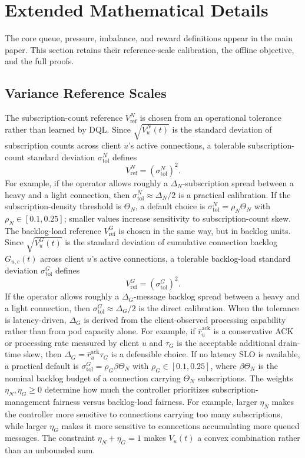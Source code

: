 \section{Extended Mathematical Details}
\label{app:extended-mathematics}
The core queue, pressure, imbalance, and reward definitions appear in the main
paper. This section retains their reference-scale calibration, the offline
objective, and the full proofs.
\subsection{Variance Reference Scales}
The subscription-count reference $V^N_{\mathrm{ref}}$ is chosen from an
operational tolerance rather than learned by DQL. Since
$\sqrt{V^N_u(t)}$ is the standard deviation of subscription counts across
client $u$'s active connections, a tolerable subscription-count standard
deviation $\sigma^{N}_{\mathrm{tol}}$ defines
\[
	V^N_{\mathrm{ref}}=(\sigma^{N}_{\mathrm{tol}})^2.
\]
For example, if the operator allows roughly a $\Delta_N$-subscription spread
between a heavy and a light connection, then
$\sigma^{N}_{\mathrm{tol}}\approx \Delta_N/2$ is a practical calibration. If
the subscription-density threshold is $\Theta_N$, a default choice is
$\sigma^{N}_{\mathrm{tol}}=\rho_N\Theta_N$ with
$\rho_N\in[0.1,0.25]$; smaller values increase sensitivity to
subscription-count skew.
The backlog-load reference $V^G_{\mathrm{ref}}$ is chosen in the same way,
but in backlog units. Since $\sqrt{V^G_u(t)}$ is the standard deviation of
cumulative connection backlog $G_{u,c}(t)$ across client $u$'s active
connections, a tolerable backlog-load standard deviation
$\sigma^{G}_{\mathrm{tol}}$ defines
\[
	V^G_{\mathrm{ref}}=(\sigma^{G}_{\mathrm{tol}})^2.
\]
If the operator allows roughly a $\Delta_G$-message backlog spread between a
heavy and a light connection, then
$\sigma^{G}_{\mathrm{tol}}\approx \Delta_G/2$ is the direct calibration. When
the tolerance is latency-driven, $\Delta_G$ is derived from the
client-observed processing capability rather than from pod capacity alone. For
example, if $\widehat{r}^{\mathrm{ack}}_{u}$ is a conservative ACK or processing rate
measured by client $u$ and $\tau_G$ is the acceptable additional drain-time
skew, then $\Delta_G=\widehat{r}^{\mathrm{ack}}_{u}\tau_G$ is a defensible choice. If
no latency SLO is available, a practical default is
$\sigma^{G}_{\mathrm{tol}}=\rho_G\beta\Theta_N$ with
$\rho_G\in[0.1,0.25]$, where $\beta\Theta_N$ is the nominal backlog budget of
a connection carrying $\Theta_N$ subscriptions.
The weights $\eta_N,\eta_G\geq0$ determine how much the controller prioritizes
subscription-management fairness versus backlog-load fairness. For example,
larger $\eta_N$ makes the controller more sensitive to connections carrying
too many subscriptions, while larger $\eta_G$ makes it more sensitive to
connections accumulating more queued messages. The constraint
$\eta_N+\eta_G=1$ makes $V_u(t)$ a convex combination rather than an
unbounded sum.
